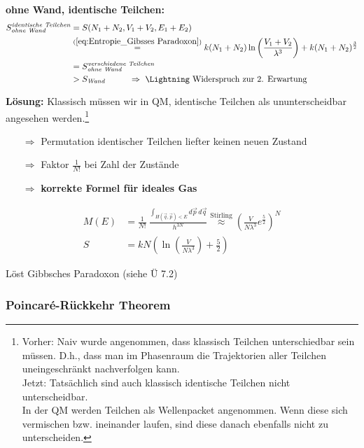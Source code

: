 \textbf{ohne Wand, identische Teilchen:}
\begin{align}
    S_{\footnotesize{\textit{ohne Wand}}}^{\footnotesize{\textit{identische Teilchen}}} &= S(N_1+N_2,V_1+V_2,E_1+E_2)  \\&\stackrel{(\ref{eq:Entropie_Gibsses Paradoxon})}{=} k (N_1 +N_2)\ln\left(\frac{V_1+V_2}{\lambda^3}\right) +k (N_1+N_2)^\frac{3}{2} \\
    &= S_{\footnotesize{\textit{ohne Wand}}}^{\footnotesize{\textit{verschiedene Teilchen}}}\\
    &> S_{\footnotesize{\textit{Wand}}} \hspace{1cm} \Rightarrow \ \text{\Lightning Widerspruch zur 2. Erwartung}
\end{align}


\textbf{Lösung:}
Klassisch müssen wir in QM, identische Teilchen als ununterscheidbar angesehen werden.\footnote{Vorher: Naiv wurde angenommen, dass klassisch Teilchen unterschiedbar sein müssen. D.h., dass man im Phasenraum die Trajektorien aller Teilchen uneingeschränkt nachverfolgen kann. \\
Jetzt: Tatsächlich sind auch klassisch identische Teilchen nicht unterscheidbar.\\
In der QM werden Teilchen als Wellenpacket angenommen. Wenn diese sich vermischen bzw. ineinander laufen, sind diese danach ebenfalls nicht zu unterscheiden.}
\begin{itemize}
    \item[$\Rightarrow$] Permutation identischer Teilchen liefter keinen neuen Zustand
    \item[$\Rightarrow$] Faktor $\frac{1}{N!}$ bei Zahl der Zustände
    \item[$\Rightarrow$] \textbf{korrekte Formel für ideales Gas}
\end{itemize}
\begin{align}
    M(E) &= \frac{1}{N!} \ \frac{\int_{H(\Vec{q}, \Vec{p})<E} d\Vec{p}\, d\Vec{q}}{h^{3N}} \stackrel{\text{Stirling}}{\approx} \left( \frac{V}{N \lambda^3} e^{\frac{5}{2}} \right) ^N\\
    S&= k N \left( \ln\left(\frac{V}{N \lambda^3}\right) + \frac{5}{2}\right)
\end{align}

Löst Gibbsches Paradoxon (siehe Ü 7.2)






\subsubsection{Poincaré-Rückkehr Theorem}

